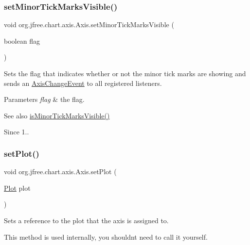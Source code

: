 \subsubsection{\texorpdfstring{set\+Minor\+Tick\+Marks\+Visible()}{setMinorTickMarksVisible()}}
{\footnotesize\ttfamily void org.\+jfree.\+chart.\+axis.\+Axis.\+set\+Minor\+Tick\+Marks\+Visible (\begin{DoxyParamCaption}\item[{boolean}]{flag }\end{DoxyParamCaption})}

Sets the flag that indicates whether or not the minor tick marks are showing and sends an \mbox{\hyperlink{}{Axis\+Change\+Event}} to all registered listeners.


\begin{DoxyParams}{Parameters}
{\em flag} & the flag.\\
\hline
\end{DoxyParams}
\begin{DoxySeeAlso}{See also}
\mbox{\hyperlink{classorg_1_1jfree_1_1chart_1_1axis_1_1_axis_ab0512be8dc8bf6d4093d9d7415a57dab}{is\+Minor\+Tick\+Marks\+Visible()}}
\end{DoxySeeAlso}
\begin{DoxySince}{Since}
1.. 
\end{DoxySince}
\mbox{\label{classorg_1_1jfree_1_1chart_1_1axis_1_1_axis_aef0fc147d7e44ccf2c020e223c6c34ca}} 
\subsubsection{\texorpdfstring{set\+Plot()}{setPlot()}}
{\footnotesize\ttfamily void org.\+jfree.\+chart.\+axis.\+Axis.\+set\+Plot (\begin{DoxyParamCaption}\item[{\mbox{\hyperlink{classorg_1_1jfree_1_1chart_1_1plot_1_1_plot}{Plot}}}]{plot }\end{DoxyParamCaption})}

Sets a reference to the plot that the axis is assigned to. 

This method is used internally, you shouldn\textquotesingle{}t need to call it yourself.


